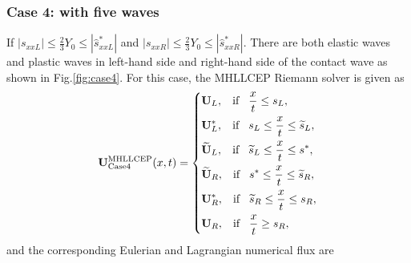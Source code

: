 \documentclass[review]{elsarticle}
\begin{document}
\subsubsection{Case 4: with five waves}
If $|s_{xxL}| \le \frac{2}{3}Y_0 \le  |\hat{s}_{xxL}^*|$ and  $|s_{xxR}| \le \frac{2}{3}Y_0 \le  |\hat{s}_{xxR}^*|$. There are  both elastic waves and plastic waves in left-hand side and right-hand side of the contact wave as shown in Fig.\ref{fig:case4}. For this case, the MHLLCEP Riemann solver is given as
 \begin{equation}
   \mathbf{U}^{\text{MHLLCEP}}_{\text{Case4}}(x,t) = \left\{ \begin{aligned}
        & \mathbf{U}_L, \hspace{0.3cm} \text{if} \hspace{0.3cm} \frac{x}{t}\le s_L, \\
        & \mathbf{U}_L^*, \hspace{0.3cm} \text{if} \hspace{0.3cm} s_L\le \frac{x}{t} \le \widetilde{s}_L, \\
        & \widetilde{\mathbf{U}}_L, \hspace{0.3cm} \text{if} \hspace{0.3cm} \widetilde{s}_L\le \frac{x}{t} \le s^*, \\
        & \widetilde{\mathbf{U}}_R, \hspace{0.3cm} \text{if} \hspace{0.3cm} s^*\le \frac{x}{t} \le \widetilde{s}_R, \\
        & \mathbf{U}_R^*, \hspace{0.3cm} \text{if} \hspace{0.3cm} \widetilde{s}_R\le \frac{x}{t} \le s_R,\\
        & \mathbf{U}_R, \hspace{0.3cm} \text{if} \hspace{0.3cm} \frac{x}{t}\ge s_R, \\
      \end{aligned}
    \right.
  \end{equation}
  and the corresponding Eulerian and Lagrangian numerical flux are
\end{document}
